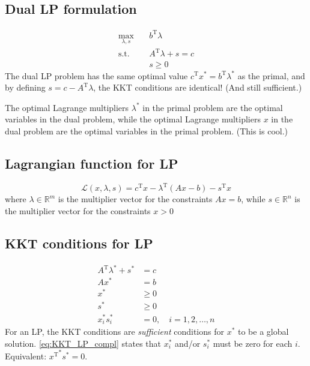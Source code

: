 \documentclass[a4paper, 12pt]{article}
\theoremstyle{definition}
\newcommand{\T}{^{\scriptscriptstyle \text{T}}}
\newcommand{\lagrange}{\mathcal{L}}
\begin{document}
\subsection{Dual LP formulation}
\begin{equation}
	\begin{aligned}
		\underset{\lambda, s}{\max}	& \quad b\T \lambda \\
		\text{s.t.}                 & \quad A\T \lambda + s = c \\
                                    & \quad s \geq 0
	\end{aligned}
\end{equation}
The dual LP problem has the same optimal value \(c\T x^* = b\T \lambda^*\) as the primal, and by defining \(s = c - A\T \lambda\), the KKT conditions are identical! (And still sufficient.)

The optimal Lagrange multipliers \(\lambda^*\) in the primal problem are the optimal variables in the dual problem, while the optimal Lagrange multipliers \(x\) in the dual problem are the
optimal variables in the primal problem. (This is cool.)



\subsection{Lagrangian function for LP}
\begin{equation}
	\lagrange (x, \lambda, s) = c\T x - \lambda\T (A x - b) - s\T x
\end{equation}
where \(\lambda \in \mathbb{R}^m\) is the multiplier vector for the constraints \(A x = b\), while \(s \in \mathbb{R}^n\) is the multiplier vector for the constraints \(x > 0\)



\subsection{KKT conditions for LP}
\begin{subequations}
	\begin{align}
		A\T \lambda^* + s^*	&= c \\
		A x^*										&= b \\
		x^*											&\geq 0 \\
		s^*										&\geq 0 \\
		x_i^* s_i^*					&= 0, \quad i = 1, 2, \hdots, n \label{eq:KKT_LP_compl}
	\end{align}
\end{subequations}
For an LP, the KKT conditions are \emph{sufficient} conditions for \(x^*\) to be a global solution. \eqref{eq:KKT_LP_compl} states that \(x_i^*\) and/or \(s_i^*\) must be zero for each \(i\). Equivalent: \({x\T}^* s^* = 0\).
\end{document}
